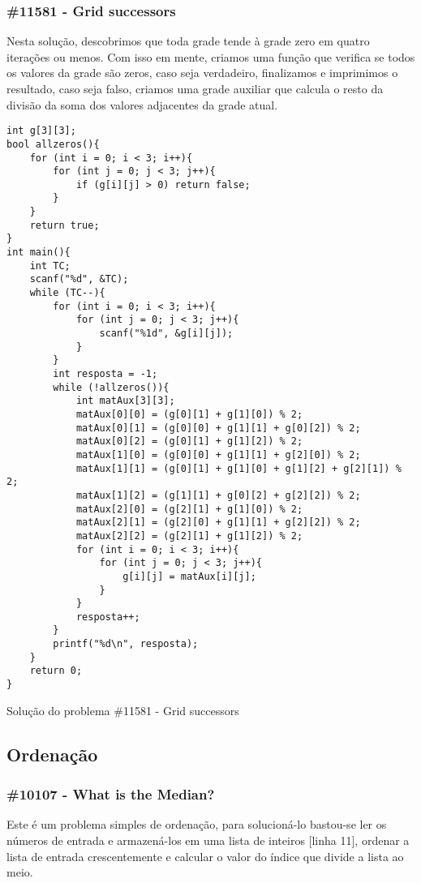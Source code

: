\documentclass[a4paper,12pt]{scrartcl}
\begin{document}
\subsubsection{\#11581 - Grid successors}
Nesta solução, descobrimos que toda grade tende à grade zero em quatro iterações ou menos. Com isso em mente, criamos uma função que verifica se todos os valores da grade são zeros, caso seja verdadeiro, finalizamos e imprimimos o resultado, caso seja falso, criamos uma grade auxiliar que calcula o resto da divisão da soma dos valores adjacentes da grade atual.
\begin{listing}[H]
\begin{verbatim}
int g[3][3];
bool allzeros(){
    for (int i = 0; i < 3; i++){
        for (int j = 0; j < 3; j++){
            if (g[i][j] > 0) return false;
        }
    }
    return true;
}
int main(){
    int TC;
    scanf("%d", &TC);
    while (TC--){
        for (int i = 0; i < 3; i++){
            for (int j = 0; j < 3; j++){
                scanf("%1d", &g[i][j]);
            }
        }
        int resposta = -1;
        while (!allzeros()){
            int matAux[3][3];  
            matAux[0][0] = (g[0][1] + g[1][0]) % 2;
            matAux[0][1] = (g[0][0] + g[1][1] + g[0][2]) % 2;
            matAux[0][2] = (g[0][1] + g[1][2]) % 2;
            matAux[1][0] = (g[0][0] + g[1][1] + g[2][0]) % 2;
            matAux[1][1] = (g[0][1] + g[1][0] + g[1][2] + g[2][1]) % 2;
            matAux[1][2] = (g[1][1] + g[0][2] + g[2][2]) % 2;
            matAux[2][0] = (g[2][1] + g[1][0]) % 2;
            matAux[2][1] = (g[2][0] + g[1][1] + g[2][2]) % 2;
            matAux[2][2] = (g[2][1] + g[1][2]) % 2;
            for (int i = 0; i < 3; i++){
                for (int j = 0; j < 3; j++){
                    g[i][j] = matAux[i][j];
                }
            }
            resposta++;
        }
        printf("%d\n", resposta);
    }
    return 0;
}
\end{verbatim}
\caption{\footnotesize{Solução do problema \#11581 - Grid successors}}
\end{listing}

\subsection{Ordenação}
\subsubsection{\#10107 - What is the Median?}
Este é um problema simples de ordenação, para solucioná-lo bastou-se ler os números de entrada e armazená-los em uma lista de inteiros [linha 11], ordenar a lista de entrada crescentemente e calcular o valor do índice que divide a lista ao meio.
\end{document}

